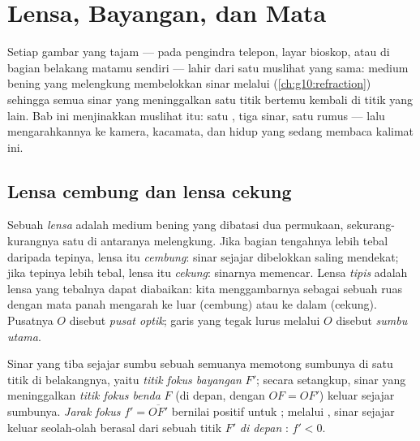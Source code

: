 \chapter{Lensa, Bayangan, dan Mata}\label{ch:g11:lenses-and-eye}

Setiap gambar yang tajam --- pada pengindra telepon, layar bioskop, atau
di bagian belakang matamu sendiri --- lahir dari satu muslihat yang
sama: medium bening yang melengkung membelokkan sinar melalui 
(\cref{ch:g10:refraction}) sehingga semua sinar yang meninggalkan satu
titik bertemu kembali di titik yang lain. Bab ini menjinakkan muslihat
itu: satu , tiga sinar, satu rumus --- lalu mengarahkannya ke
kamera, kacamata, dan  hidup yang sedang membaca kalimat ini.

\section{Lensa cembung dan lensa cekung}

\begin{definition}\label{def:g11:lenses-and-eye:lens}
Sebuah \emph{lensa} adalah medium bening yang dibatasi dua
permukaan, sekurang-kurangnya satu di antaranya melengkung. Jika
bagian tengahnya lebih tebal daripada tepinya, lensa itu
\emph{cembung}: sinar sejajar dibelokkan saling
mendekat; jika tepinya lebih tebal, lensa itu
\emph{cekung}: sinarnya memencar. Lensa
\emph{tipis} adalah lensa yang tebalnya dapat
diabaikan: kita menggambarnya sebagai sebuah ruas dengan mata panah
mengarah ke luar (cembung) atau ke dalam (cekung). Pusatnya $O$ disebut
\emph{pusat optik}; garis yang tegak lurus melalui
$O$ disebut \emph{sumbu utama}.
\end{definition}

\begin{definition}\label{def:g11:lenses-and-eye:focal}
Sinar yang tiba sejajar sumbu sebuah  semuanya memotong
sumbunya di satu titik di belakangnya, yaitu \emph{titik fokus
bayangan} $F'$; secara setangkup, sinar yang
meninggalkan \emph{titik fokus benda} $F$ (di depan, dengan
$OF = OF'$) keluar sejajar sumbunya. \emph{Jarak fokus} $f' = \overline{OF'}$ bernilai positif untuk ;
melalui , sinar sejajar keluar seolah-olah berasal dari
sebuah titik $F'$ \emph{di depan} : $f' < 0$.
\end{definition}

